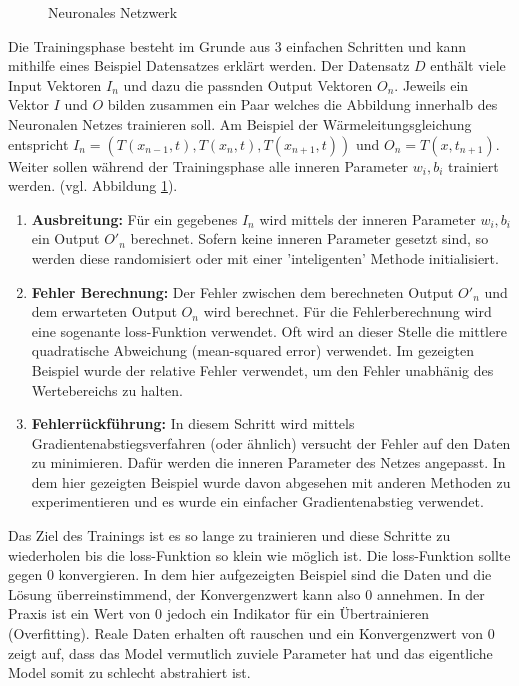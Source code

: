 \begin{figure}[h]
	\centering
	
	\label{fig:mst_neuronalnetwork}
	\caption{Neuronales Netzwerk}
\end{figure}

Die Trainingsphase besteht im Grunde aus 3 einfachen Schritten und kann mithilfe eines Beispiel Datensatzes erklärt werden. Der Datensatz $D$ enthält viele Input Vektoren $I_n$ und dazu die passnden Output Vektoren $O_n$. Jeweils ein Vektor $I$ und $O$ bilden zusammen ein Paar welches die Abbildung innerhalb des Neuronalen Netzes trainieren soll. Am Beispiel der Wärmeleitungsgleichung entspricht $I_n = (T(x_{n-1}, t), T(x_{n}, t), T(x_{n+1}, t))$ und $O_n = T(x, t_{n+1})$. Weiter sollen während der Trainingsphase alle inneren Parameter $w_{i}, b_{i}$ trainiert werden. (vgl. Abbildung \ref{fig:mst_neuronalnetwork}).
\begin{enumerate}
	\item {\textbf{Ausbreitung:} Für ein gegebenes $I_{n}$ wird mittels der inneren Parameter $w_{i}, b_{i}$ ein Output $O'_{n}$ berechnet. Sofern keine inneren Parameter gesetzt sind, so werden diese randomisiert oder mit einer 'inteligenten' Methode initialisiert.}
	\item {\textbf{Fehler Berechnung:} Der Fehler zwischen dem berechneten Output $O'_{n}$ und dem erwarteten Output $O_{n}$ wird berechnet. Für die Fehlerberechnung wird eine sogenante loss-Funktion verwendet. Oft wird an dieser Stelle die mittlere quadratische Abweichung (mean-squared error) verwendet. Im gezeigten Beispiel wurde der relative Fehler verwendet, um den Fehler unabhänig des Wertebereichs zu halten.}
	\item{ \textbf{ Fehlerrückführung:} In diesem Schritt wird mittels Gradientenabstiegsverfahren (oder ähnlich) versucht der Fehler auf den Daten zu minimieren. Dafür werden die inneren Parameter des Netzes angepasst. In dem hier gezeigten Beispiel wurde davon abgesehen mit anderen Methoden zu experimentieren und es wurde ein einfacher Gradientenabstieg verwendet.}
\end{enumerate}
Das Ziel des Trainings ist es so lange zu trainieren und diese Schritte zu wiederholen bis die loss-Funktion so klein wie möglich ist. Die loss-Funktion sollte gegen 0 konvergieren. In dem hier aufgezeigten Beispiel sind die Daten und die Lösung überreinstimmend, der Konvergenzwert kann also 0 annehmen. In der Praxis ist ein Wert von 0 jedoch ein Indikator für ein Übertrainieren (Overfitting). Reale Daten erhalten oft rauschen und ein Konvergenzwert von 0 zeigt auf, dass das Model vermutlich zuviele Parameter hat und das eigentliche Model somit zu schlecht abstrahiert ist.


